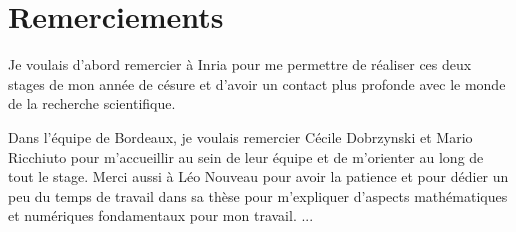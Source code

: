 \section*{Remerciements}

\indent Je voulais d'abord remercier à Inria pour me permettre de réaliser ces deux stages de mon année de césure et d'avoir un contact plus profonde avec le monde de la recherche scientifique.

\indent Dans l'équipe de Bordeaux, je voulais remercier Cécile Dobrzynski et Mario Ricchiuto pour m'accueillir au sein de leur équipe et de m'orienter au long de tout le stage. Merci aussi à Léo Nouveau pour avoir la patience et pour dédier un peu du temps de travail dans sa thèse pour m'expliquer d'aspects mathématiques et numériques fondamentaux pour mon travail.
...
